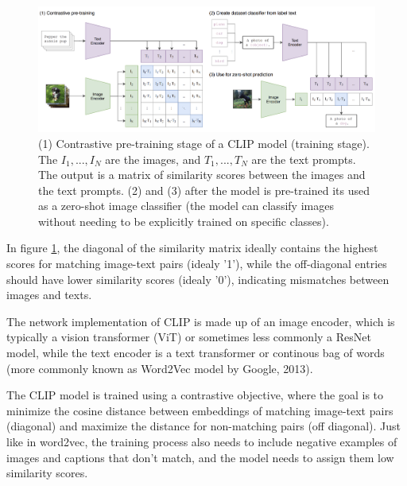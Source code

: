 \begin{figure}
    \centering
    \includegraphics[width=1\textwidth]{images/diffusion_models/stable_diffusion/clip.png}
    \caption{(1) Contrastive pre-training stage of a CLIP model \cite{openai_clip} (training stage). The $I_1, ..., I_N$ are the images, and $T_1, ..., T_N$ are the text prompts. The output is a matrix of similarity scores between the images and the text prompts. (2) and (3) after the model is pre-trained its used as a zero-shot image classifier (the model can classify images without needing to be explicitly trained on specific classes).}
    \label{fig:openai_clip}
\end{figure}

In figure \ref{fig:openai_clip}, the diagonal of the similarity matrix ideally contains the highest scores for matching image-text pairs (idealy '1'), while the off-diagonal entries should have lower similarity scores (idealy '0'), indicating mismatches between images and texts.

The network implementation of CLIP is made up of an image encoder, which is typically a vision transformer (ViT) \cite{vision_transformer} or sometimes less commonly a ResNet \cite{resnet} model, while the text encoder is a text transformer \cite{transformer} or continous bag of words \cite{cbow_word2vec} (more commonly known as Word2Vec model by Google, 2013).

The CLIP model is trained using a contrastive objective, where the goal is to minimize the cosine distance between embeddings of matching image-text pairs (diagonal) and maximize the distance for non-matching pairs (off diagonal). Just like in word2vec, the training process also needs to include negative examples of images and captions that don't match, and the model needs to assign them low similarity scores.















